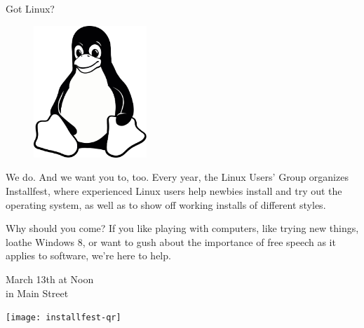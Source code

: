 \documentclass[10pt]{article}
\begin{document}
\pagestyle{empty}

\begin{center} \LARGE \textsc
    Got Linux?
\end{center}

\begin{figure}
    \vspace{-2em} %
    \begin{center}
        \includegraphics[width=0.38\textwidth]{tux-bw}
    \end{center}
\end{figure}

{\small

We do. And we want you to, too. Every year, the Linux Users' Group organizes
Installfest, where experienced Linux users help newbies install and try out the
operating system, as well as to show off working installs of different styles.

Why should you come? If you like playing with computers, like trying new things,
loathe Windows 8, or want to gush about the importance of free speech as it
applies to software, we're here to help.

}

\vfill

\begin{minipage}[bt]{0.58\textwidth}
    \begin{center}
        {\Large
            March 13th at Noon\\
            in Main Street
        }
    \end{center}
\end{minipage}
\begin{minipage}[bt]{0.38\textwidth}
    \begin{center}
        \texttt{[image: installfest-qr]}
    \end{center}
\end{minipage}
\end{document}
